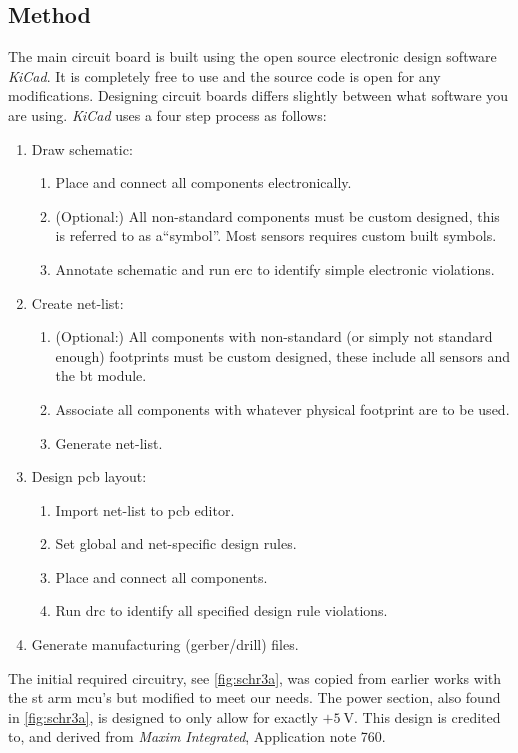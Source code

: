 \subsection{Method}
The main circuit board is built using the open source electronic design software \emph{KiCad}\cite{kicad}. It is completely free to use and the source code is open for any modifications.
Designing circuit boards differs slightly between what software you are using. \emph{KiCad} uses a four step process as follows:
\begin{enumerate}[noitemsep]
\item Draw schematic:
	\begin{enumerate}[noitemsep]
	\item Place and connect all components electronically.
	\item (Optional:) All non-standard components must be custom designed, this is referred to as a``symbol''. Most sensors requires custom built symbols.
	\item Annotate schematic and run \gls{erc} to identify simple electronic violations.
	\end{enumerate}
\item Create net-list:
	\begin{enumerate}[noitemsep]
	\item (Optional:) All components with non-standard (or simply not standard enough) footprints must be custom designed, these include all sensors and the \gls{bt} module.
	\item Associate all components with whatever physical footprint are to be used.
	\item Generate net-list.
	\end{enumerate}
\item Design \gls{pcb} layout:
	\begin{enumerate}[noitemsep]
	\item Import net-list to \gls{pcb} editor.
	\item Set global and net-specific design rules.
	\item Place and connect all components.
	\item Run \gls{drc} to identify all specified design rule violations.
	\end{enumerate}
\item Generate manufacturing (gerber/drill) files.
\end{enumerate}
The initial required circuitry, see \autoref{fig:schr3a}, was copied from earlier works with the \gls{st} \gls{arm} \gls{mcu}'s but modified to meet our needs. The power section, also found in \autoref{fig:schr3a}, is designed to only allow for exactly $+5~\textrm{V}$. This design is credited to, and derived from \emph{Maxim Integrated}, Application note 760\cite{overprotection}.


